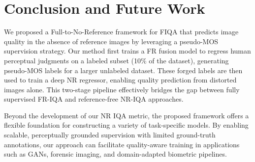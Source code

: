 \section{Conclusion and Future Work}

We proposed a Full-to-No-Reference framework for FIQA that predicts image quality in the absence of reference images by leveraging a pseudo-MOS supervision strategy. Our method first trains a FR fusion model to regress human perceptual judgments on a labeled subset (10\% of the dataset), generating pseudo-MOS labels for a larger unlabeled dataset. These forged labels are then used to train a deep NR regressor, enabling quality prediction from distorted images alone. This two-stage pipeline effectively bridges the gap between fully supervised FR-IQA and reference-free NR-IQA approaches.

Beyond the development of our NR IQA metric, the proposed framework offers a flexible foundation for constructing a variety of task-specific models. By enabling scalable, perceptually grounded supervision with limited ground-truth annotations, our approach can facilitate quality-aware training in applications such as GANs, forensic imaging, and domain-adapted biometric pipelines.